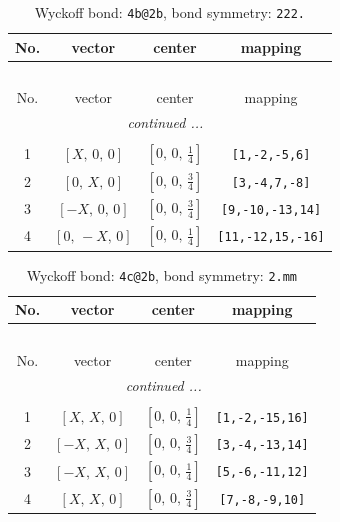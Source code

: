 \documentclass[fleqn,8pt]{jsarticle}
\begin{document}
\renewcommand{\arraystretch}{1.2}
\begin{longtable}{cccc}
\caption{Wyckoff bond: {\tt 4b@2b}, bond symmetry: {\tt 222.}}
 \\
 \hline \hline
No. & vector & center & mapping \\ \hline \endfirsthead

\multicolumn{3}{l}{\tablename\ \thetable{}} \\
 \hline \hline
No. & vector & center & mapping \\ \hline \endhead

 \hline \hline
\multicolumn{3}{r}{\footnotesize\it continued ...} \\ \endfoot

 \hline \hline
\multicolumn{3}{r}{} \\ \endlastfoot

1 & $\left[ X,\, 0,\, 0 \right]$ & $\left[ 0,\, 0,\, \frac{1}{4} \right]$ & {\tt [1,-2,-5,6]} \\ \hline
2 & $\left[ 0,\, X,\, 0 \right]$ & $\left[ 0,\, 0,\, \frac{3}{4} \right]$ & {\tt [3,-4,7,-8]} \\ \hline
3 & $\left[ - X,\, 0,\, 0 \right]$ & $\left[ 0,\, 0,\, \frac{3}{4} \right]$ & {\tt [9,-10,-13,14]} \\ \hline
4 & $\left[ 0,\, - X,\, 0 \right]$ & $\left[ 0,\, 0,\, \frac{1}{4} \right]$ & {\tt [11,-12,15,-16]} \\
\end{longtable}
\renewcommand{\arraystretch}{1.2}
\begin{longtable}{cccc}
\caption{Wyckoff bond: {\tt 4c@2b}, bond symmetry: {\tt 2.mm}}
 \\
 \hline \hline
No. & vector & center & mapping \\ \hline \endfirsthead

\multicolumn{3}{l}{\tablename\ \thetable{}} \\
 \hline \hline
No. & vector & center & mapping \\ \hline \endhead

 \hline \hline
\multicolumn{3}{r}{\footnotesize\it continued ...} \\ \endfoot

 \hline \hline
\multicolumn{3}{r}{} \\ \endlastfoot

1 & $\left[ X,\, X,\, 0 \right]$ & $\left[ 0,\, 0,\, \frac{1}{4} \right]$ & {\tt [1,-2,-15,16]} \\ \hline
2 & $\left[ - X,\, X,\, 0 \right]$ & $\left[ 0,\, 0,\, \frac{3}{4} \right]$ & {\tt [3,-4,-13,14]} \\ \hline
3 & $\left[ - X,\, X,\, 0 \right]$ & $\left[ 0,\, 0,\, \frac{1}{4} \right]$ & {\tt [5,-6,-11,12]} \\ \hline
4 & $\left[ X,\, X,\, 0 \right]$ & $\left[ 0,\, 0,\, \frac{3}{4} \right]$ & {\tt [7,-8,-9,10]} \\
\end{longtable}
\end{document}
